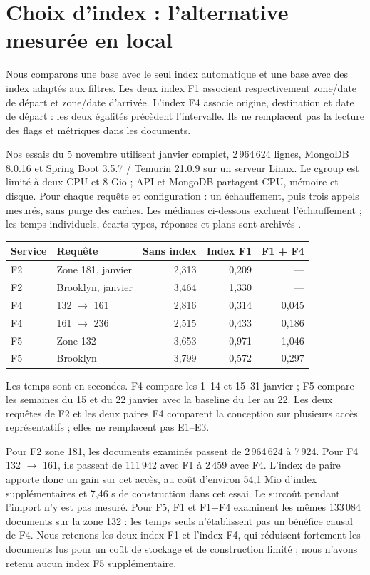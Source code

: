 \section{Choix d'index : l'alternative mesurée en local}\label{sec:mesures}
Nous comparons une base avec le seul index automatique  et une base avec des index adaptés aux filtres. Les deux index F1 associent
respectivement zone/date de départ et zone/date d'arrivée. L'index F4 associe
origine, destination et date de départ : les deux égalités précèdent l'intervalle.
Ils ne remplacent pas la lecture des flags et métriques dans les documents.

Nos essais du 5 novembre utilisent janvier complet, 2\,964\,624 lignes,
MongoDB 8.0.16 et Spring Boot 3.5.7 / Temurin 21.0.9 sur un serveur Linux.
Le cgroup est limité à deux CPU et 8 Gio ; API et MongoDB partagent CPU, mémoire
et disque. Pour chaque requête et configuration : un échauffement, puis trois
appels mesurés, sans purge des caches. Les médianes ci-dessous excluent
l'échauffement ; les temps individuels, écarts-types, réponses et plans
 sont archivés \cite{mesures}.

\begin{center}\small
\begin{tabular}{llrrr}
\toprule
Service & Requête & Sans index & Index F1 & F1 + F4\\
\midrule
F2 & Zone 181, janvier & 2,313 & 0,209 & ---\\
F2 & Brooklyn, janvier & 3,464 & 1,330 & ---\\
F4 & 132 $\to$ 161 & 2,816 & 0,314 & 0,045\\
F4 & 161 $\to$ 236 & 2,515 & 0,433 & 0,186\\
F5 & Zone 132 & 3,653 & 0,971 & 1,046\\
F5 & Brooklyn & 3,799 & 0,572 & 0,297\\
\bottomrule
\end{tabular}
\end{center}
Les temps sont en secondes. F4 compare les 1--14 et 15--31 janvier ; F5 compare
les semaines du 15 et du 22 janvier avec la baseline du 1er au 22. Les deux
requêtes de F2 et les deux paires F4 comparent la conception sur plusieurs accès
représentatifs ; elles ne remplacent pas E1--E3.

Pour F2 zone 181, les documents examinés passent de 2\,964\,624 à 7\,924.
Pour F4 132 $\to$ 161, ils passent de 111\,942 avec F1 à 2\,459 avec F4.
L'index de paire apporte donc un gain sur cet accès, au coût d'environ
54,1 Mio d'index supplémentaires et 7,46 s de construction dans cet essai.
Le surcoût pendant l'import n'y est pas mesuré. Pour F5, F1 et F1+F4 examinent
les mêmes 133\,084 documents sur la zone 132 : les temps seuls n'établissent pas
un bénéfice causal de F4. Nous retenons les deux index F1 et l'index F4, qui réduisent fortement les documents lus pour un coût de stockage et de construction limité ; nous n'avons retenu aucun index F5 supplémentaire.

